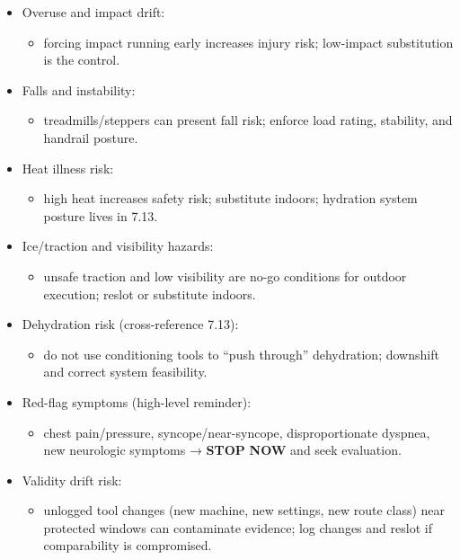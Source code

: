 \documentclass[10pt]{article}
\begin{document}
\begin{itemize}
\item Overuse and impact drift:
  \begin{itemize}
  \item forcing impact running early increases injury risk; low-impact substitution is the control.
  \end{itemize}
\item Falls and instability:
  \begin{itemize}
  \item treadmills/steppers can present fall risk; enforce load rating, stability, and handrail posture.
  \end{itemize}
\item Heat illness risk:
  \begin{itemize}
  \item high heat increases safety risk; substitute indoors; hydration system posture lives in 7.13.
  \end{itemize}
\item Ice/traction and visibility hazards:
  \begin{itemize}
  \item unsafe traction and low visibility are no-go conditions for outdoor execution; reslot or substitute indoors.
  \end{itemize}
\item Dehydration risk (cross-reference 7.13):
  \begin{itemize}
  \item do not use conditioning tools to “push through” dehydration; downshift and correct system feasibility.
  \end{itemize}
\item Red-flag symptoms (high-level reminder):
  \begin{itemize}
  \item chest pain/pressure, syncope/near-syncope, disproportionate dyspnea, new neurologic symptoms → \textbf{STOP} \textbf{NOW} and seek evaluation.
  \end{itemize}
\item Validity drift risk:
  \begin{itemize}
  \item unlogged tool changes (new machine, new settings, new route class) near protected windows can contaminate evidence; log changes and reslot if comparability is compromised.
  \end{itemize}
\end{itemize}
\end{document}
